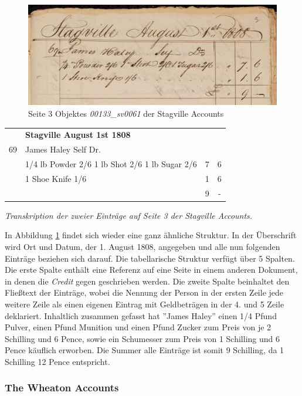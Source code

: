 \documentclass[12pt,a4paper]{article}
\begin{document}
\begin{figure}[H]
  \centering
  \includegraphics[width=1\textwidth]{img/stagville.jpg}  
  \caption[Seite 3 des Objektes \textit{00133\_sv0061} der Stagville Accounts, \protect\url{https://fromthepage.com/agbedavies/stagville-accounts/00133-sv0061/display/7884}]{Seite 3 Objektes \textit{00133\_sv0061} der Stagville Accounts} \label{fig:stagville}
\end{figure}
\begin{tabular}{clcc}
  & \textbf{Stagville August 1st 1808}\\
 69 & James Haley Self Dr. & &\\
    & 1/4 lb Powder 2/6 1 lb Shot 2/6 1 lb Sugar 2/6 & 7 & 6\\
	& 1 Shoe Knife 1/6  & 1 & 6\\
	& & 9  & -
\end{tabular}
\medskip
\begin{center}
\textit{Transkription der zweier Einträge auf Seite 3 der Stagville Accounts.}
\end{center}
In Abbildung \ref{fig:stagville} findet sich wieder eine ganz ähnliche Struktur. In der Überschrift wird Ort und Datum, der 1. August 1808, angegeben und alle nun folgenden Einträge beziehen sich darauf. Die tabellarische Struktur verfügt über 5 Spalten. Die erste Spalte enthält eine Referenz auf eine Seite in einem anderen Dokument, in denen die \textit{Credit} gegen geschrieben werden. Die zweite Spalte beinhaltet den Fließtext der Einträge, wobei die Nennung der Person in der ersten Zeile jede weitere Zeile als einen eigenen Eintrag mit Geldbeträgen in der 4. und 5 Zeile deklariert. Inhaltlich zusammen gefasst hat ''James Haley'' einen 1/4 Pfund Pulver, einen Pfund Munition und einen Pfund Zucker zum Preis von je 2 Schilling und 6 Pence, sowie ein Schumesser zum Preis von 1 Schilling und 6 Pence käuflich erworben. Die Summer alle Einträge ist somit 9 Schilling, da 1 Schilling 12 Pence entspricht.

\subsubsection{The Wheaton Accounts}
\end{document}
